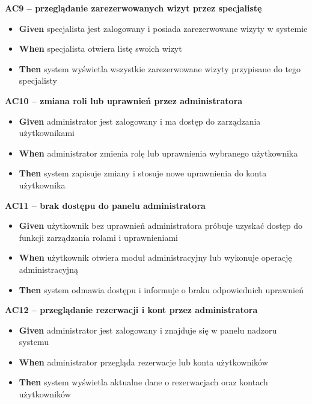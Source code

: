 \documentclass[12pt,a4paper]{article}
\begin{document}
\begin{description}[leftmargin=1.5cm, labelwidth=1cm, labelsep=0.5cm]
\vspace{0.3cm}

\textbf{AC9 -- przeglądanie zarezerwowanych wizyt przez specjalistę}
\begin{itemize}[itemsep=2pt]
    \item \textbf{Given} specjalista jest zalogowany i posiada zarezerwowane wizyty w systemie
    \item \textbf{When} specjalista otwiera listę swoich wizyt
    \item \textbf{Then} system wyświetla wszystkie zarezerwowane wizyty przypisane do tego specjalisty
\end{itemize}

\vspace{0.3cm}

\textbf{AC10 -- zmiana roli lub uprawnień przez administratora}
\begin{itemize}[itemsep=2pt]
    \item \textbf{Given} administrator jest zalogowany i ma dostęp do zarządzania użytkownikami
    \item \textbf{When} administrator zmienia rolę lub uprawnienia wybranego użytkownika
    \item \textbf{Then} system zapisuje zmiany i stosuje nowe uprawnienia do konta użytkownika
\end{itemize}

\vspace{0.3cm}

\textbf{AC11 -- brak dostępu do panelu administratora}
\begin{itemize}[itemsep=2pt]
    \item \textbf{Given} użytkownik bez uprawnień administratora próbuje uzyskać dostęp do funkcji zarządzania rolami i uprawnieniami
    \item \textbf{When} użytkownik otwiera moduł administracyjny lub wykonuje operację administracyjną
    \item \textbf{Then} system odmawia dostępu i informuje o braku odpowiednich uprawnień
\end{itemize}

\vspace{0.3cm}

\textbf{AC12 -- przeglądanie rezerwacji i kont przez administratora}
\begin{itemize}[itemsep=2pt]
    \item \textbf{Given} administrator jest zalogowany i znajduje się w panelu nadzoru systemu
    \item \textbf{When} administrator przegląda rezerwacje lub konta użytkowników
    \item \textbf{Then} system wyświetla aktualne dane o rezerwacjach oraz kontach użytkowników
\end{itemize}

\vspace{0.5cm}

\end{description}
\end{document}
